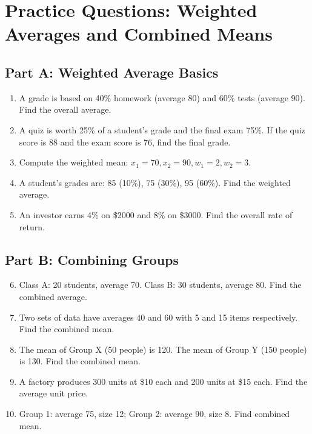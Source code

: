 \documentclass[12pt]{article}
\begin{document}

\section*{Practice Questions: Weighted Averages and Combined Means}

\subsection*{Part A: Weighted Average Basics}
\begin{enumerate}
  \item A grade is based on 40\% homework (average 80) and 60\% tests (average 90). Find the overall average.
  \item A quiz is worth 25\% of a student’s grade and the final exam 75\%. If the quiz score is 88 and the exam score is 76, find the final grade.
  \item Compute the weighted mean: \(x_1=70, x_2=90, w_1=2, w_2=3.\)
  \item A student’s grades are: 85 (10\%), 75 (30\%), 95 (60\%). Find the weighted average.
  \item An investor earns 4\% on \$2000 and 8\% on \$3000. Find the overall rate of return.
\end{enumerate}

\subsection*{Part B: Combining Groups}
\begin{enumerate}
  \setcounter{enumi}{5}
  \item Class A: 20 students, average 70. Class B: 30 students, average 80. Find the combined average.
  \item Two sets of data have averages 40 and 60 with 5 and 15 items respectively. Find the combined mean.
  \item The mean of Group X (50 people) is 120. The mean of Group Y (150 people) is 130. Find the combined mean.
  \item A factory produces 300 units at \$10 each and 200 units at \$15 each. Find the average unit price.
  \item Group 1: average 75, size 12; Group 2: average 90, size 8. Find combined mean.
\end{enumerate}
\end{document}
